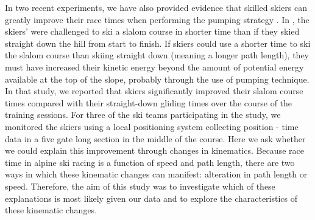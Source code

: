 \documentclass{article}
\begin{document}
In two recent experiments, we have also provided evidence that skilled skiers can greatly improve their race times when performing the pumping strategy   \cite{magelssen_is_2022, christian_magelssen_reinforcement_2024}. In \textcite{magelssen_is_2022}, the skiers' were challenged to ski a slalom course in shorter time than if they skied straight down the hill from start to finish. If skiers could use a shorter time to ski the slalom course than  skiing straight down (meaning a longer path length), they must have increased their kinetic energy beyond the amount of potential energy available at the top of the slope, probably through the use of pumping technique. In that study, we reported that  skiers significantly improved their slalom course times compared with their straight-down gliding times over the course of the training sessions. For three of the ski teams participating in the study, we monitored the skiers using a local positioning system collecting position - time data in a five gate long section in the middle of the course. Here we ask whether we could explain this improvement through changes in kinematics. Because race time in alpine ski racing is a function of speed and path length, there are two ways in which these kinematic changes can manifest: alteration in path length or  speed. Therefore, the aim of this study was to investigate which of these explanations is most likely given our data and to explore the characteristics of these kinematic changes. 

\end{document}
